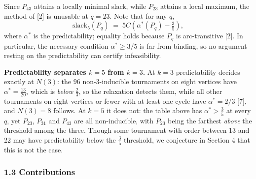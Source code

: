 \documentclass[
]{article}
\begin{document}
Since \(P_{43}\) attains a locally minimal slack, while \(P_{23}\)
attains a local maximum, the method of {[}2{]} is unusable at
\(q = 23\). Note that for any \(q\),
\[\mathrm{slack}_5(P_q) \;=\; 5C\left(\alpha^{*}(P_q) - \tfrac{3}{5}\right),\]
where \(\alpha^{*}\) is the predictability; equality holds because
\(P_q\) is arc-transitive {[}2{]}. In particular, the necessary
condition \(\alpha^{*} \ge 3/5\) is far from binding, so no argument
resting on the predictability can certify infeasibility.

\textbf{Predictability separates \(k = 5\) from \(k = 3\).} At \(k = 3\)
predictability decides exactly at \(N(3)\): the \(96\) non-3-inducible
tournaments on eight vertices have \(\alpha^{*} = \tfrac{13}{20}\),
which is \emph{below} \(\tfrac{2}{3}\), so the relaxation detects them,
while all other tournaments on eight vertices or fewer with at least one
cycle have \(\alpha^{*} = 2/3\) {[}7{]}, and \(N(3) = 8\) follows. At
\(k = 5\) it does not: the table above has \(\alpha^{*} > \tfrac{3}{5}\)
at every \(q\), yet \(P_{23}\), \(P_{31}\) and \(P_{43}\) are all
non-inducible, with \(P_{23}\) being the farthest \emph{above} the
threshold among the three. Though some tournament with order between 13
and 22 may have predictability below the \(\tfrac{3}{5}\) threshold, we
conjecture in Section 4 that this is not the case.

\subsubsection{1.3 Contributions}\label{contributions}
\end{document}
